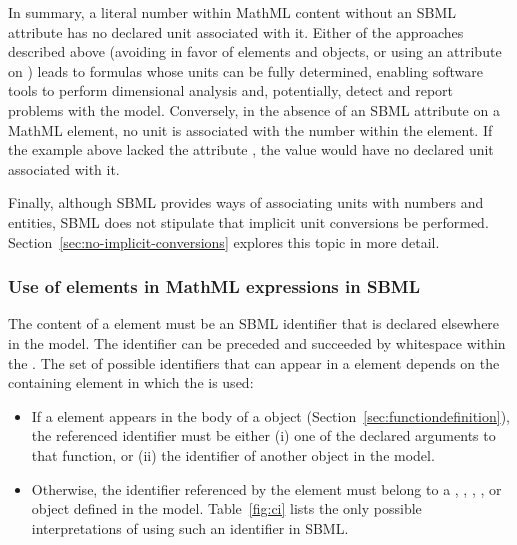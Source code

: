 In summary, a literal number within MathML content without an SBML
 attribute has no declared unit associated with it.
Either of the approaches described above (\ie avoiding 
in favor of  elements and \Parameter objects, or using
an  attribute on ) leads to formulas
whose units can be fully determined, enabling software tools to
perform dimensional analysis and, potentially, detect and report
problems with the model.  Conversely, in the absence of an SBML
 attribute on a MathML  element, no unit is
associated with the number within the  element.  If the
example above lacked the attribute , the value
 would have no declared unit associated with it.

Finally, although SBML provides ways of associating units with
numbers and entities, SBML does not stipulate that implicit unit
conversions be performed.
Section~\ref{sec:no-implicit-conversions} explores this topic in
more detail.


\subsubsection{Use of  elements in MathML expressions in SBML}
\label{sec:ci-token}

The content of a  element must be an SBML identifier
that is declared elsewhere in the model.  The identifier can be
preceded and succeeded by whitespace within the .  The
set of possible identifiers that can appear in a 
element depends on the containing element in which the 
is used:
\begin{itemize}
  
\item If a  element appears in the  body of
  a \FunctionDefinition object
  (Section~\ref{sec:functiondefinition}), the referenced
  identifier must be either (i) one of the declared arguments to
  that function, or (ii) the identifier of another
  \FunctionDefinition object in the model.
  
\item Otherwise, the identifier referenced by the 
  element must belong to a \FunctionDefinition, \Compartment,
  \Species, \Parameter, \Reaction or \SpeciesReference object
  defined in the model.  Table~\ref{fig:ci} lists the only
  possible interpretations of using such an identifier in SBML.

\end{itemize}


